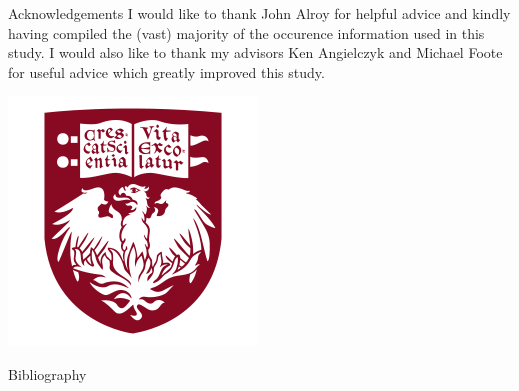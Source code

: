 \documentclass[final]{beamer}\usepackage[]{graphicx}\usepackage[]{color}
\newlength{\onecolwid}
\begin{document}
\begin{frame}[t]
\begin{columns}[t]
\begin{columns}[t,totalwidth = \onecolwid]
\begin{column}{\onecolwid}
        \begin{scriptsize}
          \begin{block}{Acknowledgements}
            I would like to thank John Alroy for helpful advice and kindly having compiled the (vast) majority of the occurence information used in this study. I would also like to thank my advisors Ken Angielczyk and Michael Foote for useful advice which greatly improved this study. 
            \begin{center}
              \includegraphics[height = 0.1\textheight]{figure/chicago}
            \end{center}
          \end{block}
        \end{scriptsize}

        \begin{scriptsize}
          \begin{block}{Bibliography}
            
            
          \end{block}
        \end{scriptsize}

      \end{column}
    \end{columns}

  \end{columns}
\end{frame}
\end{document}
